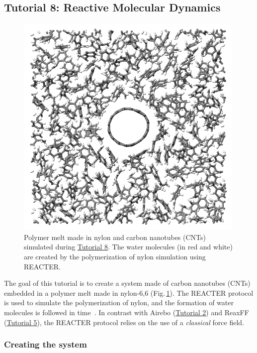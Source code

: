 \documentclass[9pt,tutorial]{livecoms}
\begin{document}
\subsection{Tutorial 8: Reactive Molecular Dynamics}
\label{bond-react-label}

\begin{figure}
\centering
\includegraphics[width=0.55\linewidth]{REACT}
\caption{Polymer melt made in nylon and carbon nanotubes (CNTs) simulated during
\hyperref[bond-react-label]{Tutorial 8}. The water molecules (in red and white)
are created by the polymerization of nylon simulation using REACTER.}
\label{fig:REACT}
\end{figure}

The goal of this tutorial is to create a system made of 
carbon nanotubes (CNTs) embedded in a polymer melt made in nylon-6,6 (Fig.\,\ref{fig:REACT}). The
REACTER protocol is used to simulate the polymerization of nylon, and the formation
of water molecules is followed in time~\cite{gissinger2020reacter, gissinger2024molecular}.
In contrast with Airebo (\hyperref[carbon-nanotube-label]{Tutorial 2})
and ReaxFF (\hyperref[reactive-silicon-dioxide-label]{Tutorial 5}), the REACTER
protocol relies on the use of a \textit{classical} force field.

\subsubsection{Creating the system}
\end{document}
